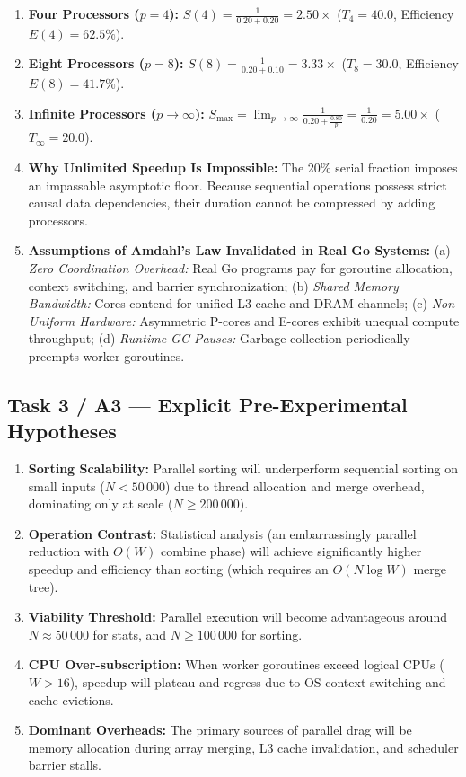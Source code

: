 \documentclass[11pt]{article}
\begin{document}
\begin{enumerate}[itemsep=0.3em]
    \item \textbf{Four Processors ($p = 4$):}
    $S(4) = \frac{1}{0.20 + 0.20} = \mathbf{2.50\times}$ \quad ($T_4 = 40.0$, Efficiency $E(4) = 62.5\%$).
    \item \textbf{Eight Processors ($p = 8$):}
    $S(8) = \frac{1}{0.20 + 0.10} = \mathbf{3.33\times}$ \quad ($T_8 = 30.0$, Efficiency $E(8) = 41.7\%$).
    \item \textbf{Infinite Processors ($p \to \infty$):}
    $S_{\max} = \lim_{p \to \infty} \frac{1}{0.20 + \frac{0.80}{p}} = \frac{1}{0.20} = \mathbf{5.00\times}$ \quad ($T_\infty = 20.0$).
    \item \textbf{Why Unlimited Speedup Is Impossible:}
    The 20\% serial fraction imposes an impassable asymptotic floor. Because sequential operations possess strict causal data dependencies, their duration cannot be compressed by adding processors.
    \item \textbf{Assumptions of Amdahl's Law Invalidated in Real Go Systems:}
    (a) \textit{Zero Coordination Overhead:} Real Go programs pay for goroutine allocation, context switching, and barrier synchronization; (b) \textit{Shared Memory Bandwidth:} Cores contend for unified L3 cache and DRAM channels; (c) \textit{Non-Uniform Hardware:} Asymmetric P-cores and E-cores exhibit unequal compute throughput; (d) \textit{Runtime GC Pauses:} Garbage collection periodically preempts worker goroutines.
\end{enumerate}

\subsection*{Task 3 / A3 --- Explicit Pre-Experimental Hypotheses}
\begin{enumerate}[label=\textbf{H\arabic*:}, leftmargin=1.6em, itemsep=0.25em]
    \item \textbf{Sorting Scalability:} Parallel sorting will underperform sequential sorting on small inputs ($N < 50\,000$) due to thread allocation and merge overhead, dominating only at scale ($N \ge 200\,000$).
    \item \textbf{Operation Contrast:} Statistical analysis (an embarrassingly parallel reduction with $O(W)$ combine phase) will achieve significantly higher speedup and efficiency than sorting (which requires an $O(N \log W)$ merge tree).
    \item \textbf{Viability Threshold:} Parallel execution will become advantageous around $N \approx 50\,000$ for stats, and $N \ge 100\,000$ for sorting.
    \item \textbf{CPU Over-subscription:} When worker goroutines exceed logical CPUs ($W > 16$), speedup will plateau and regress due to OS context switching and cache evictions.
    \item \textbf{Dominant Overheads:} The primary sources of parallel drag will be memory allocation during array merging, L3 cache invalidation, and scheduler barrier stalls.
\end{enumerate}
\end{document}
